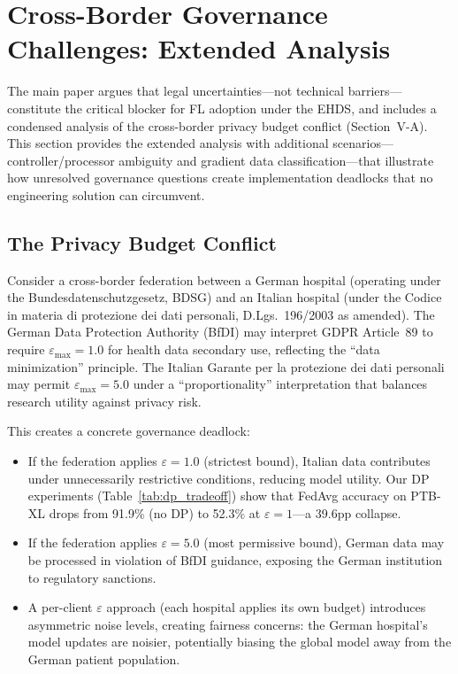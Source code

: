 \documentclass[conference]{IEEEtran}
\begin{document}
\section{Cross-Border Governance Challenges: Extended Analysis}
\label{sec:governance_challenges}

The main paper argues that legal uncertainties---not technical barriers---constitute the critical blocker for FL adoption under the EHDS, and includes a condensed analysis of the cross-border privacy budget conflict (Section~V-A). This section provides the extended analysis with additional scenarios---controller/processor ambiguity and gradient data classification---that illustrate how unresolved governance questions create implementation deadlocks that no engineering solution can circumvent.

\subsection{The Privacy Budget Conflict}

Consider a cross-border federation between a German hospital (operating under the Bundesdatenschutzgesetz, BDSG) and an Italian hospital (under the Codice in materia di protezione dei dati personali, D.Lgs.~196/2003 as amended). The German Data Protection Authority (BfDI) may interpret GDPR Article~89 to require $\varepsilon_{\max} = 1.0$ for health data secondary use, reflecting the ``data minimization'' principle. The Italian Garante per la protezione dei dati personali may permit $\varepsilon_{\max} = 5.0$ under a ``proportionality'' interpretation that balances research utility against privacy risk.

This creates a concrete governance deadlock:
\begin{itemize}
    \item If the federation applies $\varepsilon = 1.0$ (strictest bound), Italian data contributes under unnecessarily restrictive conditions, reducing model utility. Our DP experiments (Table~\ref{tab:dp_tradeoff}) show that FedAvg accuracy on PTB-XL drops from 91.9\% (no DP) to 52.3\% at $\varepsilon = 1$---a 39.6pp collapse.
    \item If the federation applies $\varepsilon = 5.0$ (most permissive bound), German data may be processed in violation of BfDI guidance, exposing the German institution to regulatory sanctions.
    \item A per-client $\varepsilon$ approach (each hospital applies its own budget) introduces asymmetric noise levels, creating fairness concerns: the German hospital's model updates are noisier, potentially biasing the global model away from the German patient population.
\end{itemize}
\end{document}
